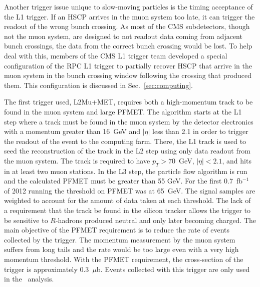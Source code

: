 Another trigger issue unique to slow-moving particles is the timing acceptance of the L1 trigger. If an HSCP arrives in the muon system too late, it can trigger the
readout of the wrong bunch crossing. As most of the CMS subdetectors, though not the muon system, are designed to not readout data coming from adjacent bunch crossings,
the data from the correct bunch crossing would be lost. To help deal with this, members of the CMS L1 trigger team developed a special configuration of the
RPC L1 trigger to partially recover HSCP that arrive in the muon system in the bunch crossing window following the crossing that produced them.
This configuration is discussed in Sec.~\ref{sec:computing}.


The first trigger used, L2Mu+MET, requires both a high-momentum track to be found in the muon system and large PFMET.
The algorithm starts at the L1 step where a track must be found in the muon system by the detector electronics with a momentum greater than 16~GeV and $|\eta|$ less than 2.1 
in order to trigger the readout of the event to the computing farm.
There, the L1 track is used to seed the reconstruction of the track in the L2 step using only data readout from the muon system.
The track is required to have $p_T > 70$~GeV, $|\eta| < 2.1$, and hits in at least two muon stations.
In the L3 step, the particle flow algorithm is run and the calculated PFMET must be greater than 55 GeV.
For the first 0.7~fb$^{-1}$ of 2012 running the threshold on PFMET was at 65~GeV. The signal samples are weighted
to account for the amount of data taken at each threshold.
The lack of a requirement that the track be found in the silicon tracker allows the trigger to be sensitive to $R$-hadrons produced neutral and only later becoming charged.
The main objective of the PFMET requirement is to reduce the rate of events collected by the trigger.
The momentum measurement by the muon system suffers from long tails and the rate would be too large even with a very high momentum threshold.
With the PFMET requirement, the cross-section of the trigger is approximately 0.3~$\mu$b.
Events collected with this trigger are only used in the \muononly\ analysis.

